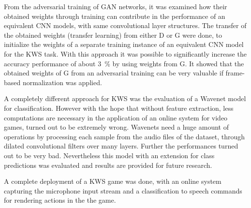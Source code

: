 From the adversarial training of GAN networks, it was examined how their obtained weights through training can contribute in the performance of an equivalent CNN models, with same convolutional layer structures.
The transfer of the obtained weights (transfer learning) from either D or G were done, to initialize the weights of a separate training instance of an equivalent CNN model for the KWS task.
With this approach it was possible to significantly increase the accuracy performance of about \SI{3}{\percent} by using weights from G.
It showed that the obtained weights of G from an adversarial training can be very valuable if frame-based normalization was applied.

A completely different approach for KWS was the evaluation of a Wavenet \cite{Oord2016} model for classification.
However with the hope that without feature extraction, less computations are necessary in the application of an online system for video games, turned out to be extremely wrong.
Wavenets need a huge amount of operations by processing each sample from the audio files of the dataset, through dilated convolutional filters over many layers.
Further the performances turned out to be very bad.
Nevertheless this model with an extension for class predictions was evaluated and results are provided for future research.

A complete deployment of a KWS game was done, with an online system capturing the microphone input stream and a classification to speech commands for rendering actions in the the game.
